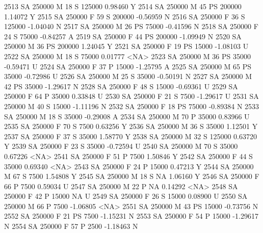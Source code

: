 \documentclass{article}
\begin{document}
\begin{Schunk}
\begin{Soutput}
2513     SA     250000   M  18         S 125000   0.98460    Y
2514     SA     250000   M  45        PS 200000   1.14072    Y
2515     SA     250000   F  59         S 200000  -0.56959    N
2516     SA     250000   F  36         S 125000  -1.04040    N
2517     SA     250000   M  26        PS  75000  -0.41596    N
2518     SA     250000   F  24         S  75000  -0.84257    A
2519     SA     250000   F  44        PS 200000  -1.09949    N
2520     SA     250000   M  36        PS 200000   1.24045    Y
2521     SA     250000   F  19        PS  15000  -1.08103    U
2522     SA     250000   M  18         S  75000   0.01777 <NA>
2523     SA     250000   M  36        PS  35000  -0.59471    U
2524     SA     250000   F  37         P  15000  -1.25795    A
2525     SA     250000   M  65        PS  35000  -0.72986    U
2526     SA     250000   M  25         S  35000  -0.50191    N
2527     SA     250000   M  42        PS  35000  -1.29617    N
2528     SA     250000   F  48         S  15000  -0.69361    U
2529     SA     250000   F  64         P  35000   0.33848    U
2530     SA     250000   F  21         S   7500  -1.29617    U
2531     SA     250000   M  40         S  15000  -1.11196    N
2532     SA     250000   F  18        PS  75000  -0.89384    N
2533     SA     250000   M  18         S  35000  -0.29008    A
2534     SA     250000   M  70         P  35000   0.83966    U
2535     SA     250000   F  70         S   7500   0.63256    Y
2536     SA     250000   M  36         S  35000   1.12501    Y
2537     SA     250000   F  37         S  35000   1.58770    Y
2538     SA     250000   M  32         S 125000   0.63720    Y
2539     SA     250000   F  23         S  35000  -0.72594    U
2540     SA     250000   M  70         S  35000   0.67226 <NA>
2541     SA     250000   F  51         P   7500   1.50846    Y
2542     SA     250000   F  44         S  35000   0.69340 <NA>
2543     SA     250000   F  24         P  15000   0.47213    Y
2544     SA     250000   M  67         S   7500   1.54808    Y
2545     SA     250000   M  18         S     NA   1.06160    Y
2546     SA     250000   F  66         P   7500   0.59034    U
2547     SA     250000   M  22         P     NA   0.14292 <NA>
2548     SA     250000   F  42         P  15000        NA    U
2549     SA     250000   F  26         S  15000   0.08900    U
2550     SA     250000   M  66         P   7500  -1.06805 <NA>
2551     SA     250000   M  43        PS  15000  -0.73756    N
2552     SA     250000   F  21        PS   7500  -1.15231    N
2553     SA     250000   F  54         P  15000  -1.29617    N
2554     SA     250000   F  57         P   2500  -1.18463    N

\end{Soutput}
\end{Schunk}
\end{document}
